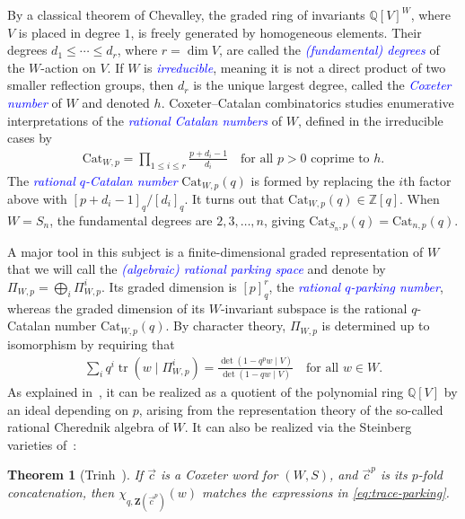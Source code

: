 \documentclass[submission]{FPSAC2025}
\newtheorem{thm}{Theorem}
\newcommand{\dfemph}[1]{\textcolor{blue}{\emph{#1}}}
\DeclareMathOperator{\tr}{tr}
\newcommand{\m}{p}
\newcommand{\Cat}{\mathrm{Cat}}
\newcommand{\CharQ}[1]{\chi_{q, #1}}
\newcommand{\ParkSpace}{\Pi}
\begin{document}
By a classical theorem of Chevalley, the graded ring of invariants $\mathbb{Q}[V]^W$, where $V$ is placed in degree $1$, is freely generated by homogeneous elements.
Their degrees $d_1 \leq \cdots \leq d_r$, where $r = \dim V$, are called the \dfemph{(fundamental) degrees} of the $W$-action on $V$.
If $W$ is \dfemph{irreducible}, meaning it is not a direct product of two smaller reflection groups, then $d_r$ is the unique largest degree, called the \dfemph{Coxeter number} of $W$ and denoted $h$.
Coxeter--Catalan combinatorics studies enumerative interpretations of the \dfemph{rational Catalan numbers} of $W$, defined in the irreducible cases by
\begin{align}\label{eq:catalan}
\Cat_{W, \m} = \prod_{1 \leq i \leq r} \frac{\m + d_i - 1}{d_i}
	\quad\text{for all $\m > 0$ coprime to $h$}.
\end{align}
The \dfemph{rational $q$-Catalan number} $\Cat_{W, \m}(q)$ is formed by replacing the $i$th factor above with $[\m + d_i - 1]_q/[d_i]_q$.
It turns out that $\Cat_{W, \m}(q) \in \mathbb{Z}[q]$.
When $W = S_n$, the fundamental degrees are $2, 3, \ldots, n$, giving $\Cat_{S_n, \m}(q) = \Cat_{n, \m}(q)$.

A major tool in this subject is a finite-dimensional graded representation of $W$ that we will call the \dfemph{(algebraic) rational parking space} and denote by $\ParkSpace_{W, \m} = \bigoplus_i \ParkSpace_{W, \m}^i$.
Its graded dimension is $[\m]_q^r$, the \dfemph{rational $q$-parking number}, whereas the graded dimension of its $W$-invariant subspace is the rational $q$-Catalan number $\Cat_{W, \m}(q)$.
By character theory, $\ParkSpace_{W, \m}$ is determined up to isomorphism by requiring that
\begin{align}\label{eq:trace-parking}
\sum_i q^i \tr(w \mid \ParkSpace_{W, \m}^i) = \frac{\det(1 - q^\m w \mid V)}{\det(1 - qw \mid V)}
	\quad\text{for all $w \in W$}.
\end{align}
As explained in~\cite{arr}, it can be realized as a quotient of the polynomial ring $\mathbb{Q}[V]$ by an ideal depending on $\m$, arising from the representation theory of the so-called rational Cherednik algebra of $W$.
It can also be realized via the Steinberg varieties of~\cite{trinh_21}:

\begin{thm}[Trinh~\cite{trinh_21}]\label{thm:trinh-parking}
If $\vec{c}$ is a Coxeter word for $(W, S)$, and $\vec{c}^\m$ is its $\m$-fold concatenation, then $\CharQ{\mathbf{Z}(\vec{c}^\m)}(w)$ matches the expressions in \eqref{eq:trace-parking}.
\end{thm}
\end{document}
